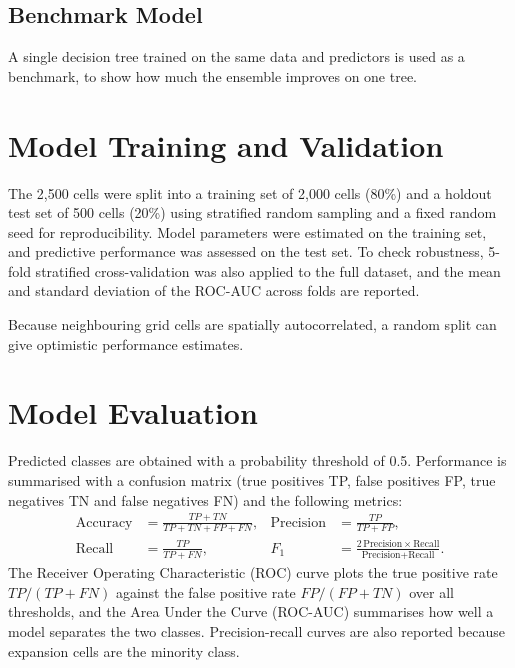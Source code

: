 \subsection{Benchmark Model}

A single decision tree trained on the same data and predictors is used as a
benchmark, to show how much the ensemble improves on one tree.

\section{Model Training and Validation}

The 2{,}500 cells were split into a training set of 2{,}000 cells (80\%) and a
holdout test set of 500 cells (20\%) using stratified random sampling and a
fixed random seed for reproducibility. Model parameters were estimated on the
training set, and predictive performance was assessed on the test set. To check
robustness, 5-fold stratified cross-validation was also applied to the full
dataset, and the mean and standard deviation of the ROC-AUC across folds are
reported.

Because neighbouring grid cells are spatially autocorrelated, a random split can
give optimistic performance estimates. 

\section{Model Evaluation}

Predicted classes are obtained with a probability threshold of 0.5. Performance
is summarised with a confusion matrix (true positives TP, false positives FP,
true negatives TN and false negatives FN) and the following metrics:
\begin{align}
\text{Accuracy}  &= \frac{TP + TN}{TP + TN + FP + FN}, &
\text{Precision} &= \frac{TP}{TP + FP}, \\
\text{Recall}    &= \frac{TP}{TP + FN}, &
F_1 &= \frac{2\,\text{Precision}\times\text{Recall}}{\text{Precision}+\text{Recall}}.
\end{align}
The Receiver Operating Characteristic (ROC) curve plots the true positive rate
$TP/(TP+FN)$ against the false positive rate $FP/(FP+TN)$ over all thresholds,
and the Area Under the Curve (ROC-AUC) summarises how well a model separates the
two classes. Precision-recall curves are also reported because expansion cells
are the minority class.

